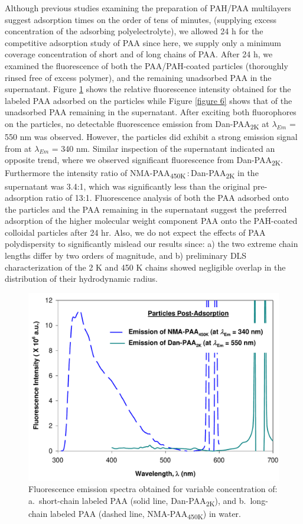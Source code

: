 \documentclass[journal=mamobx,manuscript=article]{achemso}
\begin{document}
Although previous studies examining the preparation of PAH/PAA multilayers suggest adsorption times on the order of tens of minutes, (supplying excess concentration of the adsorbing polyelectrolyte), we allowed 24 h for the competitive adsorption study of PAA since here, we supply only a minimum coverage concentration of short and of long chains of PAA.  After 24 h, we examined the fluorescence of both the PAA/PAH-coated particles (thoroughly rinsed free of excess polymer), and the remaining unadsorbed PAA in the supernatant.  Figure \ref{figure 5} shows the relative fluorescence intensity obtained for the labeled PAA adsorbed on the particles while Figure \ref{figure 6} shows that of the unadsorbed PAA remaining in the supernatant.  After exciting both fluorophores on the particles, no detectable fluorescence emission from Dan-PAA\textsubscript{2K} at $\lambda_{Em}$ = 550 nm was observed.  However, the particles did exhibit a strong emission signal from at $\lambda_{Em}$ = 340 nm.  Similar inspection of the supernatant indicated an opposite trend, where we observed significant fluorescence from Dan-PAA\textsubscript{2K}.  Furthermore the intensity ratio of NMA-PAA\textsubscript{450K}\,:\,Dan-PAA\textsubscript{2K} in the supernatant was 3.4:1, which was significantly less than the original pre-adsorption ratio of 13:1.  Fluorescence analysis of both the PAA adsorbed 
onto the particles and the PAA remaining in the supernatant suggest the preferred adsorption of the higher molecular weight component PAA onto the PAH-coated colloidal particles after 24 hr.  Also, we do not expect the effects of PAA polydispersity to significantly mislead our results since: a) the two extreme chain lengths differ by two orders of magnitude, and b) preliminary DLS characterization of the 2 K and 450 K chains showed negligible overlap in the distribution of their hydrodynamic radius.

\begin{figure}[H]
\includegraphics[scale=0.45]{Figure5_.pdf}
\caption{Fluorescence emission spectra obtained for variable concentration of: a.\ short-chain labeled PAA (solid line, Dan-PAA\textsubscript{2K}), and b.\ long-chain labeled PAA (dashed line, NMA-PAA\textsubscript{450K}) in water.}
\label{figure 5}
\end{figure}
\end{document}
